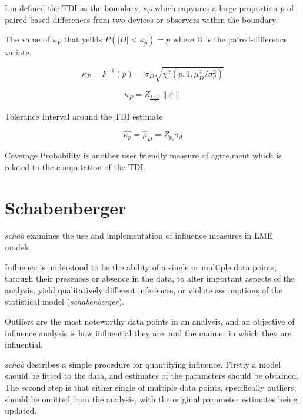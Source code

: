 \documentclass[12pt, a4paper]{report}
\begin{document}
Lin defined the TDI as the boundary, $\kappa_P$ which capyures a large proportion $p$ of paired based differences from 
two devices or observers within the boundary.

The value of $\kappa_P$ that yeilds $P(|D| <\kappa_p) = p$ where D is the paired-difference variate.


\[ \kappa_P = F^{-1}(p) = \sigma_D \sqrt{\chi^2(p,1,\mu^2_D/\sigma^2_d) }  \]

\[ \kappa_P = Z_{\frac{1+p}{2}} \| \varepsilon\| \]



Tolerance Interval around the TDI estimate

\[ \hat{\kappa_p} = \hat{\mu}_D = Z_{p_i}\sigma_d \]


Coverage Probability is another user friendly measure of agrre,ment which is related to the computation of the TDI.

\section{Schabenberger}

\emph{schab} examines the use and implementation of
influence measures in LME models.

Influence is understood to be the ability of a single or multiple
data points, through their presences or absence in the data, to
alter important aspects of the analysis, yield qualitatively
different inferences, or violate assumptions of the statistical
model (\textit{schabenberger}).

Outliers are the most noteworthy data points in an analysis, and
an objective of influence analysis is how influential they are,
and the manner in which they are influential.

\emph{schab} describes a simple procedure for quantifying
influence. Firstly a model should be fitted to the data, and
estimates of the parameters should be obtained. The second step is
that either single of multiple data points, specifically outliers,
should be omitted from the analysis, with the original parameter
estimates being updated. 
\end{document}
